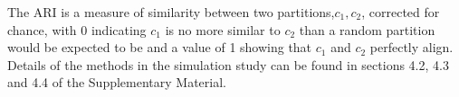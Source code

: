 \documentclass{bmcart}
\begin{document}
The ARI is a measure of similarity between two partitions,$c_1, c_2$, corrected for chance, with 0 indicating $c_1$ is no more similar to $c_2$ than a random partition would be expected to be and a value of 1 showing that $c_1$ and $c_2$ perfectly align. Details of the methods in the simulation study can be found in sections 4.2, 4.3 and 4.4 of the Supplementary Material.


%
%
\end{document}
